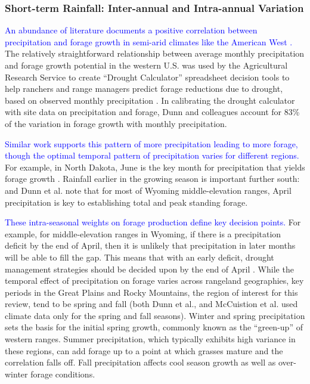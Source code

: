 \documentclass[11pt]{article}
\begin{document}
\subsubsection{Short-term Rainfall: Inter-annual and Intra-annual Variation}
\textcolor{blue}{An abundance of literature documents a positive correlation between precipitation and forage growth in semi-arid climates like the American West \citep{Yang2008, Cable1975, Houerou1977}.} The relatively straightforward relationship between average monthly precipitation and forage growth potential in the western U.S. was used by the Agricultural Research Service to create ``Drought Calculator'' spreadsheet decision tools to help ranchers and range managers predict forage reductions due to drought, based on observed monthly precipitation \citep{Dunn2013b}. In calibrating the drought calculator with site data on precipitation and forage, Dunn and colleagues account for 83\% of the variation in forage growth with monthly precipitation. 

\textcolor{blue}{Similar work supports this pattern of more precipitation leading to more forage, though the optimal temporal pattern of precipitation varies for different regions.} For example, in North Dakota, June is the key month for precipitation that yields forage growth \citep{Dunn2013b}. Rainfall earlier in the growing season is important further south: \citet{Smith2007} and Dunn et al. note that for most of Wyoming middle-elevation ranges, April precipitation is key to establishing total and peak standing forage. 

\textcolor{blue}{These intra-seasonal weights on forage production define key decision points.} For example, for middle-elevation ranges in Wyoming, if there is a precipitation deficit by the end of April, then it is unlikely that precipitation in later months will be able to fill the gap. This means that with an early deficit, drought management strategies should be decided upon by the end of April \citep{Smith2007}.  While the temporal effect of precipitation on forage varies across rangeland geographies, key periods in the Great Plains and Rocky Mountains, the region of interest for this review, tend to be spring and fall (both Dunn et al., and McCuistion et al. used climate data only for the spring and fall seasons). Winter and spring precipitation sets the basis for the initial spring growth, commonly known as the ``green-up'' of western ranges. Summer precipitation, which typically exhibits high variance in these regions, can add forage up to a point at which grasses mature and the correlation falls off. Fall precipitation affects cool season growth as well as over-winter forage conditions.
\end{document}
